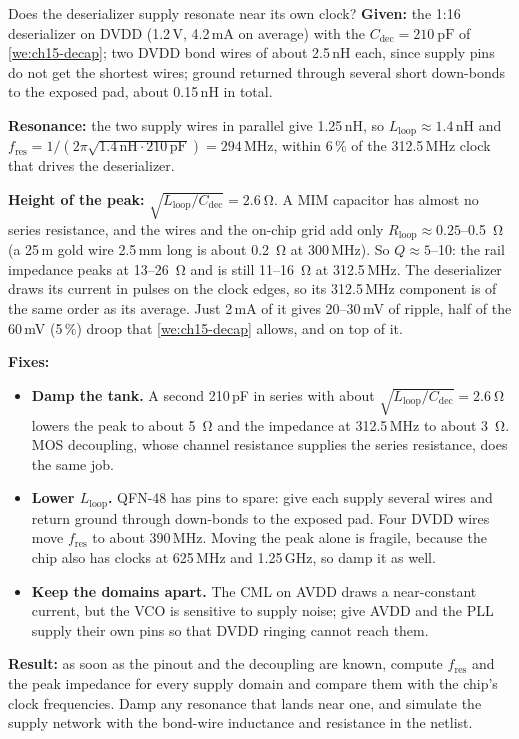 \begin{example}{Does the deserializer supply resonate near its own clock?}\label{we:ch14-pdn}
\textbf{Given:} the 1:16 deserializer on DVDD (1.2\,V, 4.2\,mA on average) with the $C_\mathrm{dec} = \qty{210}{\pico\farad}$ of \cref{we:ch15-decap}; two DVDD bond wires of about 2.5\,nH each, since supply pins do not get the shortest wires; ground returned through several short down-bonds to the exposed pad, about 0.15\,nH in total.

\textbf{Resonance:} the two supply wires in parallel give 1.25\,nH, so $L_\mathrm{loop} \approx 1.4$\,nH and $f_\mathrm{res} = 1/(2\pi\sqrt{1.4\,\mathrm{nH}\cdot210\,\mathrm{pF}}) = 294$\,MHz, within 6\,\% of the 312.5\,MHz clock that drives the deserializer.

\textbf{Height of the peak:} $\sqrt{L_\mathrm{loop}/C_\mathrm{dec}} = \qty{2.6}{\ohm}$. A MIM capacitor has almost no series resistance, and the wires and the on-chip grid add only $R_\mathrm{loop} \approx 0.25$--\qty{0.5}{\ohm} (a 25\,\textmu{}m gold wire 2.5\,mm long is about \qty{0.2}{\ohm} at 300\,MHz). So $Q \approx 5$--10: the rail impedance peaks at 13--\qty{26}{\ohm} and is still 11--\qty{16}{\ohm} at 312.5\,MHz. The deserializer draws its current in pulses on the clock edges, so its 312.5\,MHz component is of the same order as its average. Just 2\,mA of it gives 20--30\,mV of ripple, half of the 60\,mV (5\,\%) droop that \cref{we:ch15-decap} allows, and on top of it.

\textbf{Fixes:}
\begin{itemize}
  \item \textbf{Damp the tank.} A second 210\,pF in series with about $\sqrt{L_\mathrm{loop}/C_\mathrm{dec}} = \qty{2.6}{\ohm}$ lowers the peak to about \qty{5}{\ohm} and the impedance at 312.5\,MHz to about \qty{3}{\ohm}. MOS decoupling, whose channel resistance supplies the series resistance, does the same job.
  \item \textbf{Lower $L_\mathrm{loop}$.} QFN-48 has pins to spare: give each supply several wires and return ground through down-bonds to the exposed pad. Four DVDD wires move $f_\mathrm{res}$ to about 390\,MHz. Moving the peak alone is fragile, because the chip also has clocks at 625\,MHz and 1.25\,GHz, so damp it as well.
  \item \textbf{Keep the domains apart.} The CML on AVDD draws a near-constant current, but the VCO is sensitive to supply noise; give AVDD and the PLL supply their own pins so that DVDD ringing cannot reach them.
\end{itemize}

\textbf{Result:} as soon as the pinout and the decoupling are known, compute $f_\mathrm{res}$ and the peak impedance for every supply domain and compare them with the chip's clock frequencies. Damp any resonance that lands near one, and simulate the supply network with the bond-wire inductance and resistance in the netlist.
\end{example}

